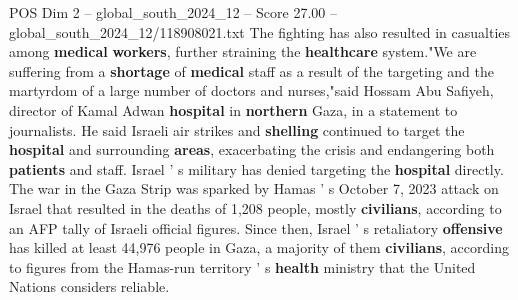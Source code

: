 \begin{textsample}{POS Dim 2 – global\_south\_2024\_12 – Score 27.00 – global\_south\_2024\_12/118908021.txt}
The fighting has also resulted in casualties among \textbf{medical} \textbf{workers}, further straining the \textbf{healthcare} system."We are suffering from a \textbf{shortage} of \textbf{medical} staff as a result of the targeting and the martyrdom of a large number of doctors and nurses,"said Hossam Abu Safiyeh, director of Kamal Adwan \textbf{hospital} in \textbf{northern} Gaza, in a statement to journalists.
He said Israeli air strikes and \textbf{shelling} continued to target the \textbf{hospital} and surrounding \textbf{areas}, exacerbating the crisis and endangering both \textbf{patients} and staff.
Israel ' s military has denied targeting the \textbf{hospital} directly.
The war in the Gaza Strip was sparked by Hamas ' s October 7, 2023 attack on Israel that resulted in the deaths of 1,208 people, mostly \textbf{civilians}, according to an AFP tally of Israeli official figures.
Since then, Israel ' s retaliatory \textbf{offensive} has killed at least 44,976 people in Gaza, a majority of them \textbf{civilians}, according to figures from the Hamas-run territory ' s \textbf{health} ministry that the United Nations considers reliable.

\end{textsample}
